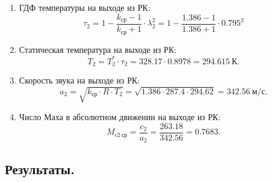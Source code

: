 \documentclass[a4paper,10pt]{article}
\begin{document}
\begin{enumerate}
        \item ГДФ температуры на выходе из РК:
        \[
            \tau_2 = 1 - \frac{ k_{ср} - 1 }{ k_{ср} + 1 } \cdot \lambda_2^2 =  
            1 - \frac{ 1.386 - 1 }{ 1.386 + 1 } \cdot 0.795^2
        \]

        \item Статическая температура на выходе из РК:
        \[
            T_2 = T_2^* \cdot \tau_2 = 328.17 \cdot 0.8978 =
            294.615\ К.
        \]

        \item Скорость звука на выходе из РК:
        \[
            a_2 = \sqrt{ k_{ср} \cdot R \cdot T_2 } = 
            \sqrt{ 1.386 \cdot 287.4 \cdot 294.62 } =
            342.56\ м/с.
        \]

         \item Число Маха в абсолютном движении на выходе из РК:
        \[
            M_{c2\ ср} = \frac{ c_2 }{ a_2 } = \frac{ 263.18 }{ 342.56 } = 
            0.7683.
        \]

    \end{enumerate}

    

    \subsection{Результаты.}

    
    
\end{document}
